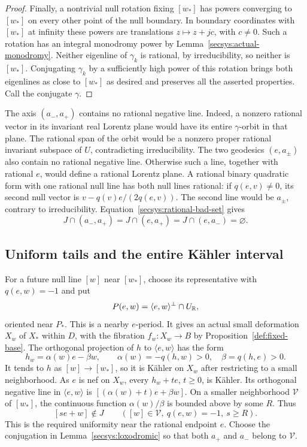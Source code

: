 \begin{proof}
Finally, a nontrivial null rotation fixing $[w_*]$ has powers converging
to $[w_*]$ on every other point of the null boundary.  In boundary
coordinates with $[w_*]$ at infinity these powers are translations
$z\mapsto z+jc$, with $c\ne0$.  Such a rotation has an integral
monodromy power by Lemma~\ref{secsys:actual-monodromy}.  Neither
eigenline of $\gamma_k$ is rational, by irreducibility, so neither is
$[w_*]$.  Conjugating $\gamma_k$ by a sufficiently high power of this
rotation brings both eigenlines as close to $[w_*]$ as desired and
preserves all the asserted properties.  Call the conjugate $\gamma$.
\end{proof}

The axis $(a_-,a_+)$ contains no rational negative line.  Indeed, a
nonzero rational vector in its invariant real Lorentz plane would
have its entire $\gamma$-orbit in that plane.  The rational span of
the orbit would be a nonzero proper rational invariant subspace of
$U$, contradicting irreducibility.  The two geodesics $(e,a_\pm)$
also contain no rational negative line.  Otherwise such a line,
together with rational $e$, would define a rational Lorentz plane.
A rational binary quadratic form with one rational null line has
both null lines rational: if $q(e,v)\ne0$, its second null vector is
$v-q(v)e/(2q(e,v))$.  The second line would be $a_\pm$, contrary
to irreducibility.  Equation~\eqref{secsys:rational-bad-set} gives
\begin{equation}\label{secsys:good-limit-geodesics}
 J\cap(a_-,a_+)=J\cap(e,a_+)=J\cap(e,a_-)=\varnothing.
\end{equation}

\subsection{Uniform tails and the entire K\"ahler interval}

For a future null line $[w]$ near $[w_*]$, choose its representative
with $q(e,w)=-1$ and put
\[
              P(e,w)=\langle e,w\rangle^\perp\cap U_{\mathbb R},
\]
oriented near $P_*$.  This is a nearby $e$-period.  It gives an actual
small deformation $X_w$ of $X_*$ within $D$, with the fibration $f_w:X_w\to B$ by
Proposition~\ref{def:fixed-base}.  The orthogonal projection of $h$ to
$\langle e,w\rangle$ has the form
\begin{equation}\label{secsys:projected-kahler}
 h_w=\alpha(w)e-\beta w,\qquad
 \alpha(w)=-q(h,w)>0,\quad \beta=q(h,e)>0.
\end{equation}
It tends to $h$ as $[w]\to[w_*]$, so it is K\"ahler on $X_w$
after restricting to a small neighborhood.  As $e$ is nef on $X_w$,
every $h_w+t e$, $t\ge0$, is K\"ahler.  Its orthogonal negative
line in $\langle e,w\rangle$ is
$[(\alpha(w)+t)e+\beta w]$.  On a smaller neighborhood $\mathcal V$
of $[w_*]$, the continuous function $\alpha(w)/\beta$ is bounded
above by some $R$.  Thus
\begin{equation}\label{secsys:uniform-tail}
 [s e+w]\notin J\qquad
 ([w]\in\mathcal V,\ q(e,w)=-1,\ s\ge R).
\end{equation}
This is the required uniformity near the rational endpoint $e$.
Choose the conjugation in Lemma~\ref{secsys:loxodromic} so that both
$a_+$ and $a_-$ belong to $\mathcal V$.

